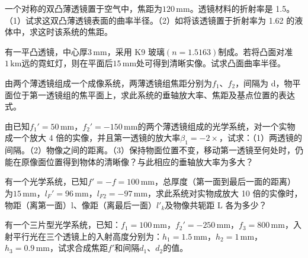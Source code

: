 \documentclass[standard, analysis, notocnum]{ExBook}
\newcommand{\answerarea}[1][8cm]{%
  \par\vspace{2mm}%
  \noindent{\color{themeColor!35}\rule{\linewidth}{0.4pt}}\par
  \noindent\begin{minipage}[t][#1][t]{\linewidth}\vspace{0pt}\end{minipage}\par
  \noindent{\color{themeColor!35}\rule{\linewidth}{0.4pt}}\par
}
\begin{document}
\begin{qitems}[startnum=8]
\qitem 一个对称的双凸薄透镜置于空气中，焦距为$120\,\mathrm{mm}$。透镜材料的折射率是 1.5。（1）试求这双凸薄透镜表面的曲率半径。（2）如将该透镜置于折射率为 1.62 的液体中，求这时该系统的焦距。
\label{q:44:start}
\answerarea[8cm]
\label{q:44:end}
\end{qitems}

\begin{qitems}[startnum=9]
\qitem 有一平凸透镜，中心厚$3\,\mathrm{mm}$，采用 K9 玻璃$(n=1.5163)$制成。若将凸面对准$1\,\mathrm{km}$远的霓虹灯，则在平面后$15\,\mathrm{mm}$处可得到清晰实像。试求凸面曲率半径。
\label{q:45:start}
\answerarea[8cm]
\label{q:45:end}
\end{qitems}

\begin{qitems}[startnum=10]
\qitem 由两个薄透镜组成一个成像系统，两薄透镜组焦距分别为$f_{1}$、$f_{2}$，间隔为 d，物平面位于第一透镜组的焦平面上，求此系统的垂轴放大率、焦距及基点位置的表达式。
\label{q:46:start}
\answerarea[8cm]
\label{q:46:end}
\end{qitems}

\begin{qitems}[startnum=11]
\qitem 由已知$f_{1}'=50\,\mathrm{mm}$，$f_{2}'=-150\,\mathrm{mm}$的两个薄透镜组成的光学系统，对一个实物成一个放大 4 倍的实像，并且第一透镜的放大率$\beta_{1}=-2\times$，试求：（1）两透镜的间隔。（2）物像之间的距离。（3）保持物面位置不变，移动第一透镜至何处时，仍能在原像面位置得到物体的清晰像？与此相应的垂轴放大率为多大？
\label{q:47:start}
\answerarea[8cm]
\label{q:47:end}
\end{qitems}

\begin{qitems}[startnum=12]
\qitem 有一个光学系统，已知$f'=-f=100\,\mathrm{mm}$，总厚度（第一面到最后一面的距离）为$15\,\mathrm{mm}$，$l_{F}'=96\,\mathrm{mm}$，$l_{F2}=-97\,\mathrm{mm}$，求此系统对实物成放大 10 倍的实像时，物距（离第一面）l、像距（离最后一面）$l'_{k}$及物像共轭距 L 各为多少？
\label{q:48:start}
\answerarea[8cm]
\label{q:48:end}
\end{qitems}

\begin{qitems}[startnum=13]
\qitem 有一个三片型光学系统，已知：$f_{1}=100\,\mathrm{mm}$，$f_{2}'=-250\,\mathrm{mm}$，$f_{3}=800\,\mathrm{mm}$，入射平行光在三个透镜上的入射高度分别为：$h_{1}=1.5\,\mathrm{mm}$，$h_{2}=1\,\mathrm{mm}$，$h_{3}=0.9\,\mathrm{mm}$，试求合成焦距$f'$和间隔$d_{1}$、$d_{2}$的值。
\label{q:49:start}
\answerarea[8cm]
\label{q:49:end}
\end{qitems}
\end{document}

